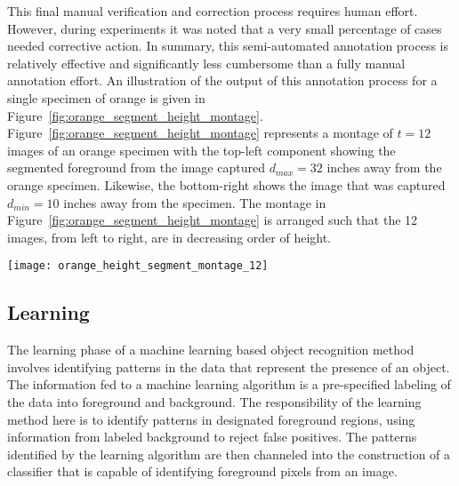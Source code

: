 This final manual verification and correction process requires human effort. However, during experiments it was noted that a very small percentage of cases needed corrective action. In summary, this semi-automated annotation process is relatively effective and significantly less cumbersome than a fully manual annotation effort. An illustration of the output of this annotation process for a single specimen of orange is given in Figure~\ref{fig:orange_segment_height_montage}. Figure~\ref{fig:orange_segment_height_montage} represents a montage of $t=12$ images of an orange specimen with the top-left component showing the segmented foreground from the image captured $d_{max}=32$ inches away from the orange specimen. Likewise, the bottom-right shows the image that was captured $d_{min}=10$ inches away from the specimen. The montage in Figure~\ref{fig:orange_segment_height_montage} is arranged such that the 12 images, from left to right, are in decreasing order of height.
%
\begin{figure*}
  \centering
  \texttt{[image: orange\_height\_segment\_montage\_12]}
  \caption[Annotation output for a single specimen]{The output of the annotation process showing a montage of the segmented foreground from a set of $t=12$ images that belong to a single orange specimen. The left-top montage component is the image of the orange specimen captured $d_{max}=32$ inches from the ground. The montage components arranged from left to right (with wrap-around after every 4 images) to progressively show images that were captured closer to the orange specimen. The closest image that was captured is $d_{min}=10$ inches away from the specimen and is shown in the bottom-most row.} 
  \label{fig:orange_segment_height_montage}
\end{figure*}	
%


\subsection{Learning}


The learning phase of a machine learning based object recognition method involves identifying patterns in the data that represent the presence of an object. The information fed to a machine learning algorithm is a pre-specified labeling of the data into foreground and background. The responsibility of the learning method here is to identify patterns in designated foreground regions, using information from labeled background to reject false positives. The patterns identified by the learning algorithm are then channeled into the construction of a classifier that is capable of identifying foreground pixels from an image.

